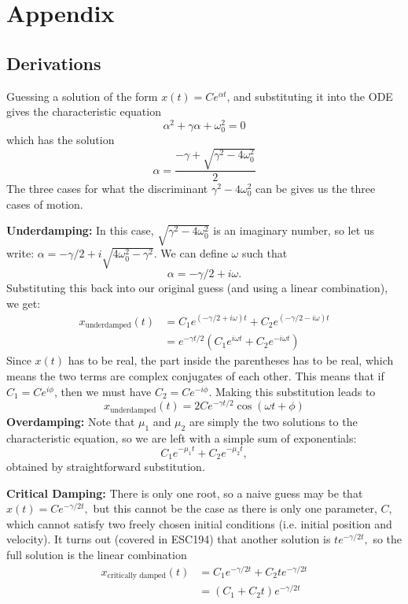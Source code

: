 \documentclass{article}
\begin{document}
\newpage
\section{Appendix}
\subsection{Derivations}
Guessing a solution of the form $x(t)=Ce^{\alpha t}$, and substituting it into the ODE gives the characteristic equation 
\begin{equation}
    \alpha^2 + \gamma \alpha + \omega_0^2 = 0
\end{equation}
which has the solution 
\begin{equation}
    \alpha = \frac{-\gamma + \sqrt{\gamma^2 - 4\omega_0^2}}{2}
\end{equation}
The three cases for what the discriminant $\gamma^2-4\omega_0^2$ can be gives us the three cases of motion.

\textbf{Underdamping:} In this case, $\sqrt{\gamma^2-4\omega_0^2}$ is an imaginary number, so let us write: $\alpha = -\gamma/2 + i\sqrt{4\omega_0^2-\gamma^2}$. We can define $\omega$ such that 
\begin{equation}
    \alpha = -\gamma/2 + i\omega.
\end{equation}
Substituting this back into our original guess (and using a linear combination), we get: 
\begin{align}
    x_\text{underdamped}(t) &= C_1e^{(-\gamma/2 + i\omega)t}+C_2e^{(-\gamma/2 - i\omega)t} \\ 
    &= e^{-\gamma t/2}\left(C_1e^{i\omega t} + C_2e^{-i\omega t}\right)
\end{align}
Since $x(t)$ has to be real, the part inside the parentheses has to be real, which means the two terms are complex conjugates of each other. This means that if $C_1=Ce^{i\phi}$, then we must have $C_2 =Ce^{-i\phi}$. Making this substitution leads to 
\begin{equation}
    x_\text{underdamped}(t) = 2Ce^{-\gamma t/2}\cos(\omega t+\phi)
\end{equation}
\textbf{Overdamping:} Note that $\mu_1$ and $\mu_2$ are simply the two solutions to the characteristic equation, so we are left with a simple sum of exponentials: 
\begin{equation}
    C_1e^{-\mu_1 t} + C_2e^{-\mu_2 t},
\end{equation}
obtained by straightforward substitution.

\textbf{Critical Damping:} There is only one root, so a naive guess may be that $x(t) = Ce^{-\gamma/2 t},$ but this cannot be the case as there is only one parameter, $C$, which cannot satisfy two freely chosen initial conditions (i.e. initial position and velocity). It turns out (covered in ESC194) that another solution is $te^{-\gamma/2 t},$ so the full solution is the linear combination 
\begin{align}
    x_\text{critically damped}(t) &= C_1e^{-\gamma/2 t} + C_2te^{-\gamma/2 t} \\ 
    &= (C_1+C_2t)e^{-\gamma/2 t}
\end{align} 
\end{document}
